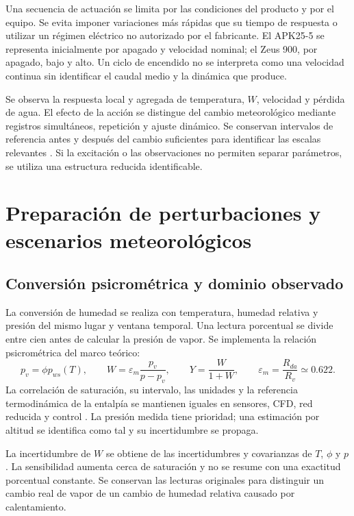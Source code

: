 Una secuencia de actuación se limita por las condiciones del producto y por el equipo. Se evita imponer variaciones más rápidas que su tiempo de respuesta o utilizar un régimen eléctrico no autorizado por el fabricante. El APK25-5 se representa inicialmente por apagado y velocidad nominal; el Zeus 900, por apagado, bajo y alto. Un ciclo de encendido no se interpreta como una velocidad continua sin identificar el caudal medio y la dinámica que produce.

Se observa la respuesta local y agregada de temperatura, $W$, velocidad y pérdida de agua. El efecto de la acción se distingue del cambio meteorológico mediante registros simultáneos, repetición y ajuste dinámico. Se conservan intervalos de referencia antes y después del cambio suficientes para identificar las escalas relevantes \cite{ljung1999}. Si la excitación o las observaciones no permiten separar parámetros, se utiliza una estructura reducida identificable.

\section{Preparación de perturbaciones y escenarios meteorológicos}
\label{met:meteorologia}

\subsection{Conversión psicrométrica y dominio observado}

La conversión de humedad se realiza con temperatura, humedad relativa y presión del mismo lugar y ventana temporal. Una lectura porcentual se divide entre cien antes de calcular la presión de vapor. Se implementa la relación psicrométrica del marco teórico:
\begin{equation}
p_v=\phi p_{ws}(T),\qquad
W=\varepsilon_m\frac{p_v}{p-p_v},\qquad
Y=\frac{W}{1+W},\qquad
\varepsilon_m=\frac{R_{da}}{R_v}\simeq0.622.
\label{met:conversion_humedad}
\end{equation}
La correlación de saturación, su intervalo, las unidades y la referencia termodinámica de la entalpía se mantienen iguales en sensores, CFD, red reducida y control \cite{ashrae2021}. La presión medida tiene prioridad; una estimación por altitud se identifica como tal y su incertidumbre se propaga.

La incertidumbre de $W$ se obtiene de las incertidumbres y covarianzas de $T$, $\phi$ y $p$. La sensibilidad aumenta cerca de saturación y no se resume con una exactitud porcentual constante. Se conservan las lecturas originales para distinguir un cambio real de vapor de un cambio de humedad relativa causado por calentamiento.

